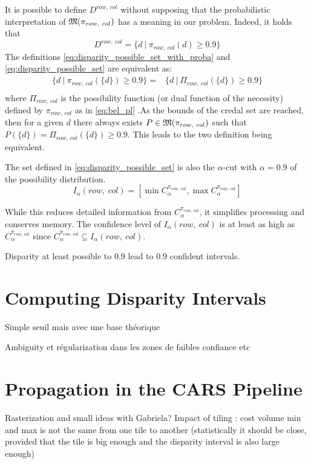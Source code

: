 It is possible to define \( D^{row,~col} \) without supposing that the probabilistic interpretation of \( \mathfrak{M}(\pi_{row,~col}) \) has a meaning in our problem. Indeed, it holds that 
\begin{equation}
    D^{row,~col}=\{ d~|~\pi_{row,~col}(d)\geqslant 0.9 \}\label{eq:disparity_possible_set}
\end{equation}
The definitions \eqref{eq:disparity_possible_set_with_proba} and \eqref{eq:disparity_possible_set} are equivalent as:
\begin{align*}
    \{ d~|~\pi_{row,~col}(\{d\})\geqslant 0.9 \} =& \{ d~|~\Pi_{row,~col}(\{d\})\geqslant 0.9 \}\\
\end{align*}
where \( \Pi_{row,~col} \) is the possibility function (or dual function of the necessity) defined by \( \pi_{row,~col} \) as in \cref{eq:bel_pl} .As the bounds of the credal set are reached, then for a given \(d\) there always exists \(P\in\mathfrak{M}(\pi_{row,~col})\) such that \( P(\{d\}) = \Pi_{row,~col}(\{d\})\geqslant 0.9\). This leads to the two definition being equivalent.

The set defined in \eqref{eq:disparity_possible_set} is also the \(\alpha\)-cut with \(\alpha=0.9\) of the possibility distribution. 
\begin{equation}
    I_\alpha(row,~col) = [\min C^{\pi_{row,~col}}_\alpha, \max C^{\pi_{row,~col}}_\alpha] \label{eq:confidence_interval}
\end{equation}

While this reduces detailed information from \( C^{\pi_{row,~col}}_\alpha \), it simplifies processing and conserves memory. The confidence level of \( I_\alpha(row,~col) \) is at least as high as \( C^{\pi_{row,~col}}_\alpha \) since \( C^{\pi_{row,~col}}_\alpha \subseteq I_\alpha(row,~col) \). 

Disparity at least possible to 0.9 lead to 0.9 confident intervals. 

\section{Computing Disparity Intervals}
Simple seuil mais avec une base théorique

Ambiguity et régularization dans les zones de faibles confiance etc
\section{Propagation in the CARS Pipeline}
Rasterization and small ideas with Gabriela?
Impact of tiling : cost volume min and max is not the same from one tile to another (statistically it should be close, provided that the tile is big enough and the disparity interval is also large enough)

